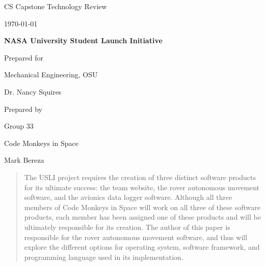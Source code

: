 \documentclass[onecolumn, draftclsnofoot,10pt, compsoc]{IEEEtran}
\def \CapstoneTeamName{			Code Monkeys in Space}
\def \CapstoneTeamNumber{		33}
\def \GroupMemberOne{			Mark Bereza}
\def \CapstoneProjectName{		NASA University Student Launch Initiative}
\def \CapstoneSponsorCompany{	Mechanical Engineering, OSU}
\def \CapstoneSponsorPerson{	Dr. Nancy Squires}
\def \DocType{	%
				Technology Review
			 }
\newcommand{\NameSigPair}[1]{\par
\makebox[2.75in][r]{#1} \hfil 	\makebox[3.25in]{\makebox[2.25in]{\hrulefill} \hfill		\makebox[.75in]{\hrulefill}}
\par\vspace{-12pt} \textit{\tiny\noindent
\makebox[2.75in]{} \hfil		\makebox[3.25in]{\makebox[2.25in][r]{Signature} \hfill	\makebox[.75in][r]{Date}}}}
\renewcommand{\NameSigPair}[1]{#1}
\begin{document}
\begin{titlepage}
    \begin{singlespace}
        \hfill 
        \par\vspace{.2in}
        \centering
        \scshape{
            \huge CS Capstone \DocType \par
            {\large\today}\par
            \vspace{.5in}
            \textbf{\Huge\CapstoneProjectName}\par
            \vfill
            {\large Prepared for}\par
            \Huge \CapstoneSponsorCompany\par
            \vspace{5pt}
            {\Large\NameSigPair{\CapstoneSponsorPerson}\par}
            {\large Prepared by }\par
            Group\CapstoneTeamNumber\par
            \CapstoneTeamName\par 
            \vspace{5pt}
            {\Large
                \NameSigPair{\GroupMemberOne}\par
            }
            \vspace{20pt}
        }
        \begin{abstract}
        	The USLI project requires the creation of three distinct software products for its ultimate success: the team website, the rover autonomous movement software, and the avionics data logger software. Although all three members of Code Monkeys in Space will work on all three of these software products, each member has been assigned one of these products and will be ultimately responsible for its creation. The author of this paper is responsible for the rover autonomous movement software, and thus will explore the different options for operating system, software framework, and programming language used in its implementation.
        \end{abstract}     
    \end{singlespace}
\end{titlepage}
\newpage
{}
\tableofcontents
\clearpage
\end{document}
